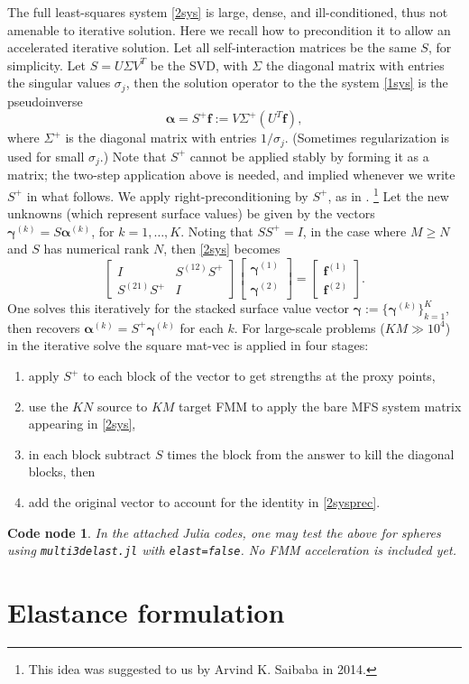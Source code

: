 \documentclass[10pt]{article}
\newcommand{\ben}{\begin{enumerate}}
\newcommand{\een}{\end{enumerate}}
\newcommand{\be}{\begin{equation}}
\newcommand{\ee}{\end{equation}}
\newcommand{\vt}[2]{\left[\begin{array}{r}#1\\#2\end{array}\right]} %
\newcommand{\mt}[4]{\left[\begin{array}{ll}#1&#2\\#3&#4\end{array}\right]} %
\newtheorem{cno}[thm]{Code node}
\newcommand{\f}{\mathbf{f}}
\newcommand{\bal}{\bm{\alpha}}
\newcommand{\bga}{\bm{\gamma}}
\newcommand{\ok}{^{(k)}}
\begin{document}
The full least-squares
system \eqref{2sys} is large, dense, and ill-conditioned,
thus not amenable to iterative solution.
Here we recall how to precondition it to allow an accelerated iterative
solution.
Let all self-interaction matrices be the same $S$, for simplicity.
Let $S = U \Sigma V^T$ be the SVD,
with $\Sigma$ the diagonal matrix with entries the singular values $\sigma_j$,
then
the solution operator to the the system \eqref{1sys}
is the pseudoinverse
$$
\bal = S^+ \f := V \Sigma^+ (U^T \f),
$$
where $\Sigma^+$ is the diagonal matrix with entries $1/\sigma_j$.
(Sometimes regularization is used for small $\sigma_j$.)
Note that $S^+$ cannot be applied stably by forming it as a matrix;
the two-step application above is needed, and implied whenever we
write $S^+$ in what follows.
We apply right-preconditioning by $S^+$, as in \cite{acper}.
\footnote{This idea was suggested to us by Arvind K. Saibaba in 2014.}
Let the new unknowns (which represent surface values)
be given by the vectors $\bga\ok = S \bal\ok$,
for $k=1,\dots,K$.
Noting that $S S^+ = I$, in the case where $M\ge N$ and $S$ has
numerical rank $N$, then
\eqref{2sys} becomes
\be
\mt{I}{S^{(12)}S^+}{S^{(21)}S^+}{I} \vt{\bga^{(1)}}{\bga^{(2)}} = \vt{\f^{(1)}}{\f^{(2)}}.
\label{2sysprec}
\ee
One solves this iteratively for the stacked surface value vector
$\bga := \{\bga\ok\}_{k=1}^K$,
then recovers $\bal\ok = S^+ \bga\ok$ for each $k$.
For large-scale problems ($KM \gg 10^4$) in the iterative solve the
square mat-vec is applied in four stages:
\ben
\item apply $S^+$ to each block of the vector to get strengths at the proxy points,
\item use the $KN$ source to $KM$ target FMM to apply the bare
MFS system matrix appearing in \eqref{2sys},
\item in each block subtract $S$ times the block from the answer
  to kill the diagonal blocks, then
\item
  add the original vector to
account for the identity in \eqref{2sysprec}.
\een

\begin{cno}
In the attached Julia codes, one may test the above for spheres using
{\tt multi3delast.jl} with {\tt elast=false}.
No FMM acceleration is included yet.
\end{cno}


\section{Elastance formulation}
\end{document}
